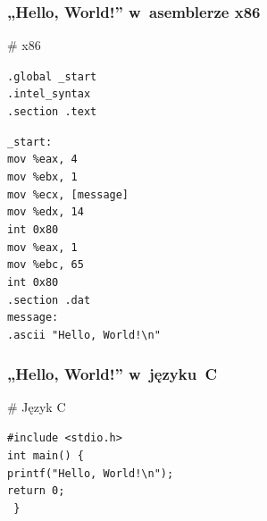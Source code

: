 \documentclass[10pt,t]{beamer}
\begin{document}
\begin{frame}
  \frametitle{„Hello, World!” w~asemblerze x86
    \parencite{Low-Level-You-Can-Learn-Assembly-in-10-Minutes-ETC-Ver-2020}}


  \# x86

  \texttt{.global \_start} \\
  \texttt{.intel\_syntax} \\
  \texttt{.section .text}

  \texttt{\_start:} \\
  \hphantom{aaaa} \texttt{mov \%eax, 4} \\
  \hphantom{aaaa} \texttt{mov \%ebx, 1} \\
  \hphantom{aaaa} \texttt{mov \%ecx, [message]} \\
  \hphantom{aaaa} \texttt{mov \%edx, 14} \\
  \hphantom{aaaa} \texttt{int 0x80} \\
  \hphantom{aaaa} \texttt{mov \%eax, 1} \\
  \hphantom{aaaa} \texttt{mov \%ebc, 65} \\
  \hphantom{aaaa} \texttt{int 0x80} \\
  \texttt{.section .dat} \\
  \texttt{message:} \\
  \hphantom{aaaa} \texttt{.ascii "Hello, World!\textbackslash n"}

\end{frame}





\begin{frame}
  \frametitle{„Hello, World!” w~języku~C}


  \# Język C

  \texttt{\#include <stdio.h>} \\
  \vspace{0.8em}
  \texttt{int main() \{ } \\
  \hphantom{aaaa} \texttt{printf("Hello, World!\textbackslash n");} \\
  \vspace{0.8em}
  \vspace{0.8em}
  \vspace{0.8em}
  \vspace{0.8em}
  \hphantom{aaaa} \texttt{return 0;} \\
  \texttt{ \} }

\end{frame}
\end{document}
